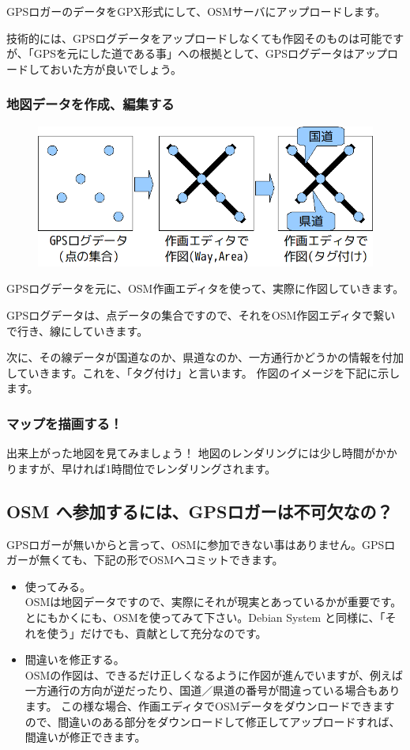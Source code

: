 \documentclass[mingoth,a4paper]{jsarticle}
\begin{document}
GPSロガーのデータをGPX形式にして、OSMサーバにアップロードします。

技術的には、GPSログデータをアップロードしなくても作図そのものは可能ですが、「GPSを元にした道である事」への根拠として、GPSログデータはアップロードしておいた方が良いでしょう。

\subsubsection{地図データを作成、編集する}

\begin{figure}[h]
 \centering
 \includegraphics[scale=0.7]{image200912/debianosm5.png}
\end{figure}

GPSログデータを元に、OSM作画エディタを使って、実際に作図していきます。

GPSログデータは、点データの集合ですので、それをOSM作図エディタで繋いで行き、線にしていきます。

次に、その線データが国道なのか、県道なのか、一方通行かどうかの情報を付加していきます。これを、「タグ付け」と言います。
作図のイメージを下記に示します。

\subsubsection{マップを描画する！ }
出来上がった地図を見てみましょう！
地図のレンダリングには少し時間がかかりますが、早ければ1時間位でレンダリングされます。

\subsection{OSM へ参加するには、GPSロガーは不可欠なの？}

GPSロガーが無いからと言って、OSMに参加できない事はありません。GPSロガーが無くても、下記の形でOSMへコミットできます。

\begin{itemize}
 \item 使ってみる。\\
OSMは地図データですので、実際にそれが現実とあっているかが重要です。とにもかくにも、OSMを使ってみて下さい。Debian System と同様に、「それを使う」だけでも、貢献として充分なのです。
 \item 間違いを修正する。\\
OSMの作図は、できるだけ正しくなるように作図が進んでいますが、例えば一方通行の方向が逆だったり、国道／県道の番号が間違っている場合もあります。
この様な場合、作画エディタでOSMデータをダウンロードできますので、間違いのある部分をダウンロードして修正してアップロードすれば、間違いが修正できます。
\end{itemize}
\end{document}
